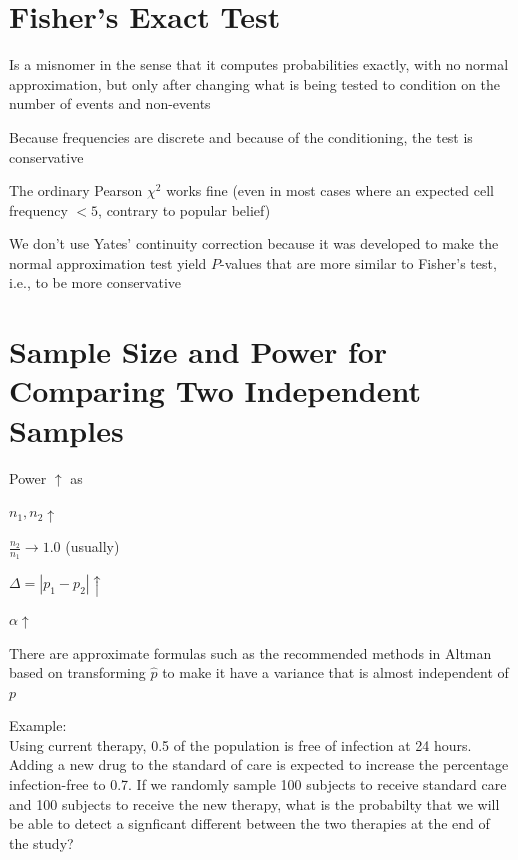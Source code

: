 \section{Fisher's Exact Test}
\bi
\item Is a misnomer in the sense that it computes probabilities
  exactly, with no normal approximation, but only after changing what
  is being tested to condition on the number of events and non-events
\item Because frequencies are discrete and because of the
  conditioning, the test is conservative
\item The ordinary Pearson $\chi^2$ works fine (even in most cases
  where an expected cell frequency $< 5$, contrary to popular belief)
\item We don't use Yates' continuity correction because it was
  developed to make the normal approximation test yield $P$-values
  that are more similar to Fisher's test, i.e., to be more
  conservative
\ei

\section{Sample Size and Power for Comparing Two Independent Samples}
\bi
\item Power $\uparrow$ as
 \bi
 \item $n_{1}, n_{2} \uparrow$
 \item $\frac{n_{2}}{n_{1}} \rightarrow 1.0$ (usually)
 \item $\Delta = |p_{1}-p_{2}| \uparrow$
 \item $\alpha \uparrow$
 \ei
\item There are approximate formulas such as the recommended methods in Altman based on transforming $\hat{p}$ to make it have a
  variance that is almost independent of $p$ 
\item Example:  \\

Using current therapy, 0.5 of the population is free of infection at 24 hours.  Adding a new drug to the standard of care is expected to increase the percentage infection-free to 0.7.  If we randomly sample 100 subjects to receive standard care and 100 subjects to receive the new therapy, what is the probabilty that we will be able to detect a signficant different between the two therapies at the end of the study?

